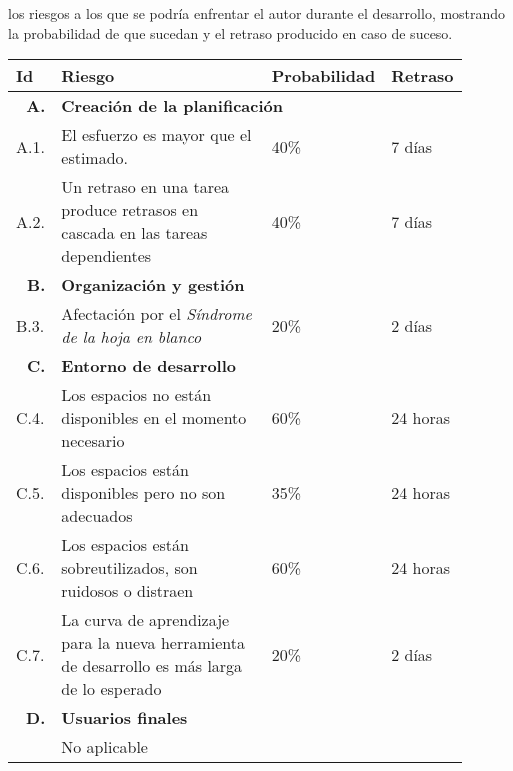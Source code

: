 	los riesgos a los que se podría enfrentar el autor durante el desarrollo, mostrando la probabilidad de que sucedan y el retraso producido en caso de suceso.
	
	\begin{table}[H]
	  \centering 
	  \begin{tabular}{p{0.1\linewidth}p{0.5\linewidth}p{0.15\linewidth}p{0.15\linewidth}}
  	    \multicolumn{1}{l}{\cellcolor{black!30}\textbf{Id}} &
	    \multicolumn{1}{l}{\cellcolor{black!30}\textbf{Riesgo}} & 
	 	\multicolumn{1}{c}{\cellcolor{black!30}\textbf{Probabilidad}} &
 	 	\multicolumn{1}{c}{\cellcolor{black!30}\textbf{Retraso}}
	 	\\	 
	    \toprule
   	    
   	    \multicolumn{1}{r}{\cellcolor{black!30}\textbf{A. }} &
		\multicolumn{3}{l}{\cellcolor{black!30}\textbf{Creación de la planificación}}\\
		A.1. &El esfuerzo es mayor que el estimado.											&	40\%	&	7 días	\\
		A.2. &Un retraso en una tarea produce retrasos en cascada en las tareas dependientes 	&	40\%	&	7 días	\\
		
		\multicolumn{1}{r}{\cellcolor{black!30}\textbf{B. }} &
		\multicolumn{3}{l}{\cellcolor{black!30}\textbf{Organización y gestión}}\\
		B.3. &Afectación por el \textit{Síndrome de la hoja en blanco}							&	20\%	&	2 días	\\
		
		\multicolumn{1}{r}{\cellcolor{black!30}\textbf{C. }} &
		\multicolumn{3}{l}{\cellcolor{black!30}\textbf{Entorno de desarrollo}}\\
		C.4. &Los espacios no están disponibles en el momento necesario						&	60\%	&	24 horas\\
		C.5. &Los espacios están disponibles pero no son adecuados								&	35\%	&	24 horas\\
		C.6. &Los espacios están sobreutilizados, son ruidosos o distraen						&	60\%	&	24 horas\\
		C.7. &La curva de aprendizaje para la nueva herramienta de desarrollo es más larga de lo esperado	&	20\%	&	2 días	\\
		
		\multicolumn{1}{r}{\cellcolor{black!30}\textbf{D. }} &
		\multicolumn{3}{l}{\cellcolor{black!30}\textbf{Usuarios finales}}\\
		&No aplicable&&\\
		

\end{tabular}
\end{table}
